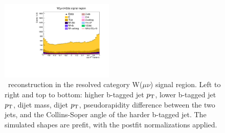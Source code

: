 \begin{figure}[tbp]
\begin{center}
    \includegraphics[width=0.48\textwidth]{figures/wlnhbb2016/resolved/WmnWHSR_hbbCosThetaCSJ1.pdf}
    \caption{\HBB\ reconstruction in the resolved category W($\mu\nu$) signal region.
    Left to right and top to bottom: higher b-tagged jet $p_{\mathrm{T}}$, lower b-tagged jet $p_{\mathrm{T}}$, dijet mass, dijet $p_{\mathrm{T}}$, 
    pseudorapidity difference between the two jets, and the Collins-Soper angle of the harder b-tagged jet.
    The simulated shapes are prefit, with the postfit normalizations applied.}
    \label{fig:res_WmnSR_Hbb}
  \end{center}
\end{figure}
\clearpage

